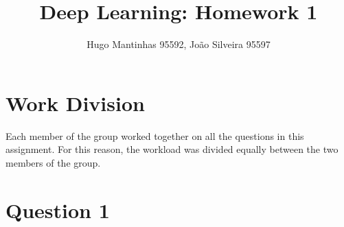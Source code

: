 \documentclass[12pt]{article}
\begin{document}
\title{Deep Learning: Homework 1}
\author{Hugo Mantinhas 95592, João Silveira 95597}

\maketitle

\section*{Work Division}

Each member of the group worked together on all the questions in this assignment. For this reason, the workload was divided equally between the two members of the group.

\section*{Question 1}
\end{document}
